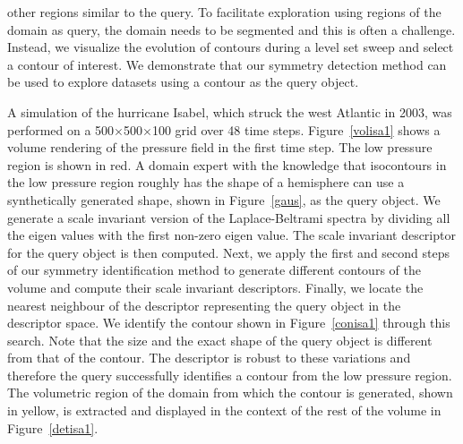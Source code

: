 \documentclass[review,journal]{vgtc}         %
\begin{document}
other regions similar to the query. To facilitate exploration using regions of the domain as query, the domain 
needs to be segmented and this is often a challenge. Instead, we visualize the
evolution of contours during a level set sweep and select a contour of interest. 
We demonstrate that our symmetry detection method can be used to explore datasets using a contour as the query object.

A simulation of the hurricane Isabel, which struck the west Atlantic in 2003, was performed
on a 500$\times$500$\times$100 grid over 48 time steps. Figure~\ref{volisa1} shows a volume rendering
of the pressure field in the first time step. The low pressure region
is shown in red. A domain expert with the knowledge that isocontours in the low pressure region
roughly has the shape of a hemisphere can use a synthetically generated shape, shown in 
Figure~\ref{gaus}, as the query object. We generate a scale invariant version of the Laplace-Beltrami
spectra by dividing all the eigen values with the first non-zero eigen value. The scale invariant
descriptor for the query object is then computed. Next, we apply the first and second steps of
our symmetry identification method to generate different contours of the 
volume and compute their scale invariant descriptors. Finally, we locate the nearest neighbour of the descriptor 
representing the query object in the descriptor space. We identify the contour
shown in Figure~\ref{conisa1} through this search. Note that the size and the exact shape of the
query object is different from that of the contour.
The descriptor is robust to these variations and therefore the query successfully identifies 
a contour from the low pressure region. The volumetric region of the domain from which the contour
is generated, shown in yellow, is extracted and displayed in the context of the rest of the volume in 
Figure~\ref{detisa1}. 
\end{document}
